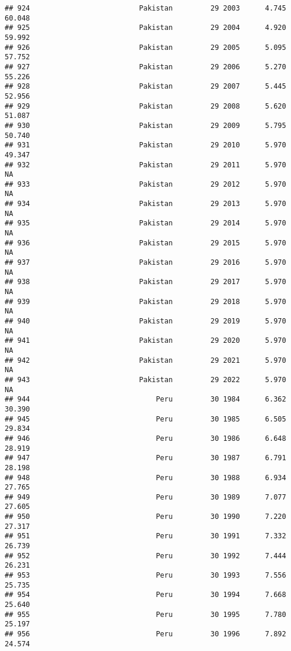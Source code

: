 \documentclass[
]{article}
\begin{document}
\begin{verbatim}
## 924                          Pakistan         29 2003      4.745     60.048
## 925                          Pakistan         29 2004      4.920     59.992
## 926                          Pakistan         29 2005      5.095     57.752
## 927                          Pakistan         29 2006      5.270     55.226
## 928                          Pakistan         29 2007      5.445     52.956
## 929                          Pakistan         29 2008      5.620     51.087
## 930                          Pakistan         29 2009      5.795     50.740
## 931                          Pakistan         29 2010      5.970     49.347
## 932                          Pakistan         29 2011      5.970         NA
## 933                          Pakistan         29 2012      5.970         NA
## 934                          Pakistan         29 2013      5.970         NA
## 935                          Pakistan         29 2014      5.970         NA
## 936                          Pakistan         29 2015      5.970         NA
## 937                          Pakistan         29 2016      5.970         NA
## 938                          Pakistan         29 2017      5.970         NA
## 939                          Pakistan         29 2018      5.970         NA
## 940                          Pakistan         29 2019      5.970         NA
## 941                          Pakistan         29 2020      5.970         NA
## 942                          Pakistan         29 2021      5.970         NA
## 943                          Pakistan         29 2022      5.970         NA
## 944                              Peru         30 1984      6.362     30.390
## 945                              Peru         30 1985      6.505     29.834
## 946                              Peru         30 1986      6.648     28.919
## 947                              Peru         30 1987      6.791     28.198
## 948                              Peru         30 1988      6.934     27.765
## 949                              Peru         30 1989      7.077     27.605
## 950                              Peru         30 1990      7.220     27.317
## 951                              Peru         30 1991      7.332     26.739
## 952                              Peru         30 1992      7.444     26.231
## 953                              Peru         30 1993      7.556     25.735
## 954                              Peru         30 1994      7.668     25.640
## 955                              Peru         30 1995      7.780     25.197
## 956                              Peru         30 1996      7.892     24.574

\end{verbatim}
\end{document}
